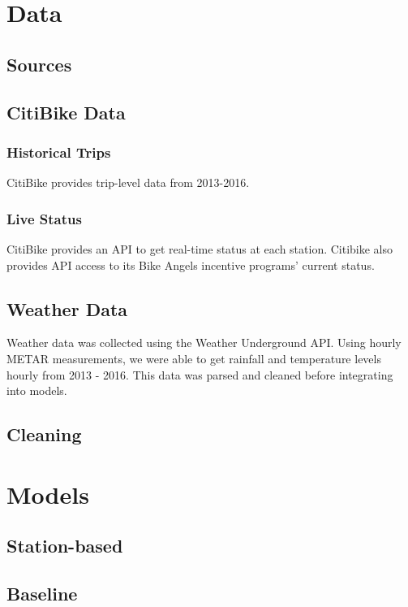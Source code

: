 \documentclass{proc}
\begin{document}
\section{Data}
\subsection{Sources}

\subsection{CitiBike Data}

\subsubsection{Historical Trips}
CitiBike provides trip-level data from 2013-2016.

\subsubsection{Live Status}
CitiBike provides an API to get real-time status at each station. Citibike also provides API access to its Bike Angels incentive programs' current status.

\subsection{Weather Data}

Weather data was collected using the Weather Underground API. Using hourly METAR measurements, we were able to get rainfall and temperature levels hourly from 2013 - 2016. This data was parsed and cleaned before integrating into models.



\subsection{Cleaning}


\section{Models}
\subsection{Station-based}
\subsection{Baseline}
\end{document}

